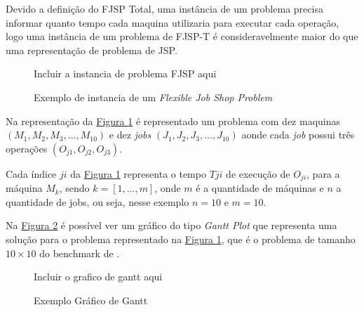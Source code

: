             Devido a definição do FJSP Total, uma instância de um problema precisa informar quanto tempo cada maquina utilizaria para executar cada operação, logo uma instância de um problema de FJSP-T é consideravelmente maior do que uma representação de problema de JSP.\hfill\vspace{\onelineskip}
            
            \begin{figure}[ht]
                \centering
                \small{Incluir a instancia de problema FJSP aqui}
                \caption{Exemplo de instancia de um \textit{Flexible Job Shop Problem}}
                \label{fig:ex-instancia-problema-FJSP}
            \end{figure}
            
            Na representação da 
            \hyperref[fig:ex-instancia-problema-FJSP]{Figura \ref{fig:ex-instancia-problema-FJSP}} 
            é representado um problema com dez maquinas $(M_1, M_2, M_3, ..., M_{10})$ e dez \textit{jobs} $(J_1, J_2, J_3, ..., J_{10})$ aonde cada \textit{job} possui três operações $(O_{j1}, O_{j2}, O_{j3})$.\hfill\vspace{\onelineskip}

            Cada índice $ji$ da 
            \hyperref[fig:ex-instancia-problema-FJSP]{Figura \ref{fig:ex-instancia-problema-FJSP}} 
            representa o tempo $T{ji}$ de execução de $O_{ji}$, para a máquina $M_k$, 
            sendo $k=[1, ..., m]$, onde $m$ é a quantidade de máquinas e $n$ a quantidade de jobs, ou seja, nesse exemplo $n=10$ e $m=10$.\breakline
            
            



            Na 
            \hyperref[fig:plot-gantt]{Figura \ref{fig:plot-gantt}} 
            é possível ver um gráfico do tipo \textit{Gantt Plot} que representa uma solução para o problema representado na 
            \hyperref[fig:ex-instancia-problema-FJSP]{Figura \ref{fig:ex-instancia-problema-FJSP}}, 
            que é o problema de tamanho $10\times10$ do benchmark de  \cite{Kacem2002}.\breakline
            
            \begin{figure}[ht]
                \centering
                \small{Incluir o grafico de gantt aqui}
                \caption{Exemplo Gráfico de Gantt}
                \label{fig:plot-gantt}
            \end{figure}
            
